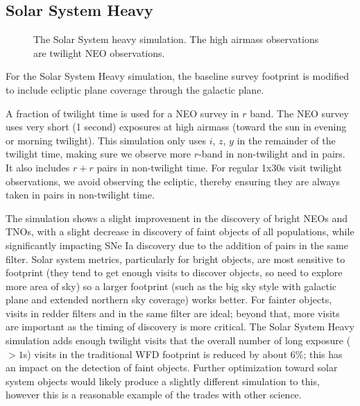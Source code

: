 \subsection{Solar System Heavy}\label{ss:1.6solarsystemheavy}
\begin{figure}
\caption{The Solar System heavy simulation. The high airmass observations are twilight NEO observations.}\label{fig:ssheavy}
\end{figure}

For the Solar System Heavy simulation, the baseline survey footprint is modified to include ecliptic plane coverage through the galactic plane.

A fraction of twilight time is used for a NEO survey in $r$ band. The NEO survey uses very short (1 second) exposures at high airmass (toward the sun in evening or morning twilight). This simulation only uses $i$, $z$, $y$ in the remainder of the twilight time, making sure we observe more $r$-band in non-twilight and in pairs. It also includes $r+r$ pairs in non-twilight time.  For regular 1x30s visit twilight observations, we avoid observing the ecliptic, thereby ensuring they are always taken in pairs in non-twilight time.

The simulation shows a slight improvement in the discovery of bright NEOs and TNOs, with a slight decrease in discovery of faint objects of all populations, while significantly impacting SNe Ia discovery due to the addition of pairs in the same filter. Solar system metrics, particularly for bright objects, are most sensitive to footprint (they tend to get enough visits to discover objects, so need to explore more area of sky) so a larger footprint (such as the big sky style with galactic plane and extended northern sky coverage) works better. For fainter objects, visits in redder filters and in the same filter are ideal; beyond that, more visits are important as the timing of discovery is more critical. The Solar System Heavy simulation adds enough twilight visits that the overall number of long exposure ($>1$s) visits in the traditional WFD footprint is reduced by about 6\%; this has an impact on the detection of faint objects. Further optimization toward solar system objects would likely produce a slightly different simulation to this, however this is a reasonable example of the trades with other science. 


